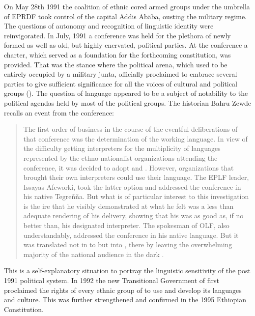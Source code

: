 \documentclass[output=paper,modfonts]{langscibook}
\begin{document}
On May 28th 1991 the coalition of ethnic cored armed groups under the umbrella of EPRDF took control of the capital Addis Abäba, ousting the military regime. The questions of autonomy and recognition of linguistic identity were reinvigorated. In July, 1991 a conference was held for the plethora of newly formed as well as old, but highly enervated, political parties. At the conference a charter, which served as a foundation for the forthcoming constitution, was provided. That was the stance where the political arena, which used to be entirely occupied by a military junta, officially proclaimed to embrace several parties to give sufficient significance for all the voices of cultural and political groups (\citealt{Bahru2008,Kassahun2003}). The question of language appeared to be a subject of notability to the political agendas held by most of the political groups. The historian Bahru Zewde recalls an event from the conference:

\begin{quote}
The first order of business in the course of the eventful deliberations of that conference was the determination of the working language. In view of the difficulty getting interpreters for the multiplicity of languages represented by the ethno-nationalist organizations attending the conference, it was decided to adopt  and . However, organizations that brought their own interpreters could use their language. The EPLF leader, Issayas Afeworki, took the latter option and addressed the conference in his native Tegreñña. But what is of particular interest to this investigation is the ire that he visibly demonstrated at what he felt was a less than adequate  rendering of his delivery, showing that his  was as good as, if no better than, his designated interpreter. The spokesman of OLF, also understandably, addressed the conference in his native  language. But it was translated not in to  but into , there by leaving the overwhelming majority of the national audience in the dark \citep[77]{Bahru2008}.
\end{quote}

This is a self-explanatory situation to portray the linguistic sensitivity of the post 1991 political system. In 1992  the new Transitional Government of  first proclaimed the rights of every ethnic group of  to use and develop its languages and culture. This was further strengthened and confirmed in the 1995 Ethiopian Constitution. 
\end{document}
